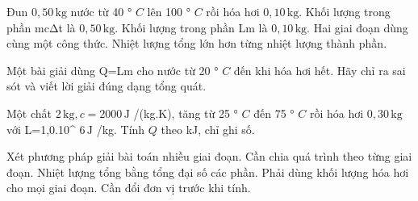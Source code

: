 \begin{ex}
Đun $0,50\,\text{kg}$ nước từ 40 ° $C$ lên 100 ° $C$ rồi hóa hơi $0,10\,\text{kg}$.
\choiceTF
{\True Khối lượng trong phần mcΔt là $0,50\,\text{kg}$.}
{\True Khối lượng trong phần Lm là $0,10\,\text{kg}$.}
{Hai giai đoạn dùng cùng một công thức.}
{\True Nhiệt lượng tổng lớn hơn từng nhiệt lượng thành phần.}
\end{ex}

\begin{bt}
Một bài giải dùng Q=Lm cho nước từ 20 ° $C$ đến khi hóa hơi hết. Hãy chỉ ra sai sót và viết lời giải đúng dạng tổng quát.
\end{bt}

\begin{ex}
Một chất $2\,\text{kg}, c=2000\,\text{J}$ /(kg.K), tăng từ 25 ° $C$ đến 75 ° $C$ rồi hóa hơi $0,30\,\text{kg}$ với L=1,0.10^ $6\,\text{J}$ /kg. Tính $Q$ theo kJ, chỉ ghi số.
\end{ex}

\begin{ex}
Xét phương pháp giải bài toán nhiều giai đoạn.
\choiceTF
{\True Cần chia quá trình theo từng giai đoạn.}
{\True Nhiệt lượng tổng bằng tổng đại số các phần.}
{Phải dùng khối lượng hóa hơi cho mọi giai đoạn.}
{\True Cần đổi đơn vị trước khi tính.}
\end{ex}

